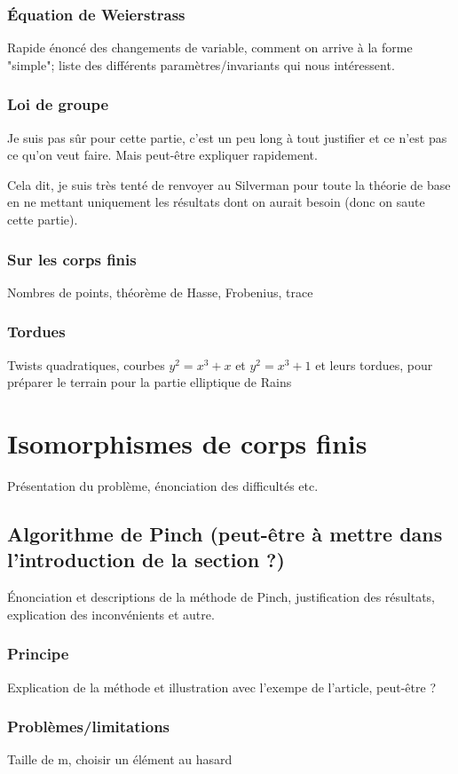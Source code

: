 \documentclass[a4paper]{article} %
\numberwithin{equation}{section}
\begin{document}
{\subsubsection{Équation de Weierstrass}
Rapide énoncé des changements de variable, comment on arrive à la forme
"simple"; liste des différents paramètres/invariants qui nous intéressent.
\subsubsection{Loi de groupe}
Je suis pas sûr pour cette partie, c'est un peu long à tout justifier et ce
n'est pas ce qu'on veut faire. Mais peut-être expliquer rapidement.\par
Cela dit, je suis très tenté de renvoyer au Silverman pour toute la théorie de
base en ne mettant uniquement les résultats dont on aurait besoin (donc on saute
cette partie).
\subsubsection{Sur les corps finis}
Nombres de points, théorème de Hasse, Frobenius, trace
\subsubsection{Tordues}
Twists quadratiques, courbes $y^2 = x^3 + x$ et $y^2 = x^3 + 1$ et leurs
tordues, pour préparer le terrain pour la partie elliptique de Rains


\section{Isomorphismes de corps finis}
Présentation du problème, énonciation des difficultés etc.

\subsection{Algorithme de Pinch (peut-être à mettre dans l'introduction de 
la section ?)}
Énonciation et descriptions de la méthode de Pinch, justification des 
résultats, explication des inconvénients et autre.
\subsubsection{Principe}
Explication de la méthode et illustration avec l'exempe de l'article, peut-être
?
\subsubsection{Problèmes/limitations}
Taille de m, choisir un élément au hasard

}
\end{document}
